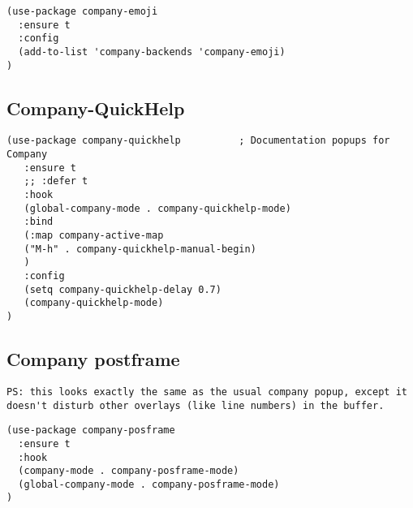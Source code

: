 \documentclass[11pt]{article}
\begin{document}
\begin{verbatim}
(use-package company-emoji
  :ensure t
  :config
  (add-to-list 'company-backends 'company-emoji)
)
\end{verbatim}

\subsection*{Company-QuickHelp}
\label{sec:org381139e}
\begin{verbatim}
(use-package company-quickhelp          ; Documentation popups for Company
   :ensure t
   ;; :defer t
   :hook
   (global-company-mode . company-quickhelp-mode)
   :bind
   (:map company-active-map
   ("M-h" . company-quickhelp-manual-begin)
   )
   :config
   (setq company-quickhelp-delay 0.7)
   (company-quickhelp-mode)
)
\end{verbatim}

\subsection*{Company postframe}
\label{sec:orgd51a39c}

\begin{verbatim}
PS: this looks exactly the same as the usual company popup, except it doesn't disturb other overlays (like line numbers) in the buffer.
\end{verbatim}

\begin{verbatim}
(use-package company-posframe
  :ensure t
  :hook
  (company-mode . company-posframe-mode)
  (global-company-mode . company-posframe-mode)
)
\end{verbatim}
\end{document}
